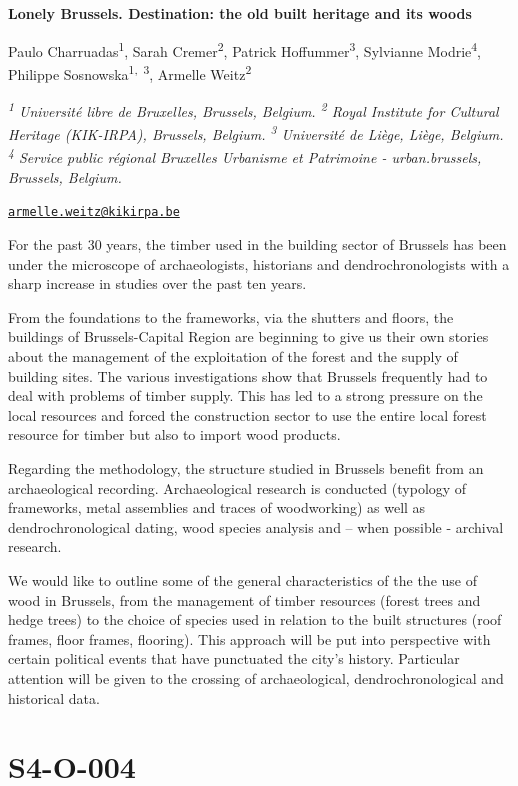 \documentclass[
]{book}
\begin{document}
\textbf{Lonely Brussels. Destination: the old built heritage and its woods}

Paulo Charruadas\textsuperscript{1}, Sarah Cremer\textsuperscript{2}, Patrick Hoffummer\textsuperscript{3}, Sylvianne Modrie\textsuperscript{4}, Philippe Sosnowska\textsuperscript{1,~3}, Armelle Weitz\textsuperscript{2}

\emph{\textsuperscript{1} Université libre de Bruxelles, Brussels, Belgium. \textsuperscript{2} Royal Institute for Cultural Heritage (KIK-IRPA), Brussels, Belgium. \textsuperscript{3} Université de Liège, Liège, Belgium. \textsuperscript{4} Service public régional Bruxelles Urbanisme et Patrimoine - urban.brussels, Brussels, Belgium.}

\href{mailto:armelle.weitz@kikirpa.be}{\nolinkurl{armelle.weitz@kikirpa.be}}

For the past 30 years, the timber used in the building sector of Brussels has been under the microscope of archaeologists, historians and dendrochronologists with a sharp increase in studies over the past ten years.

From the foundations to the frameworks, via the shutters and floors, the buildings of Brussels-Capital Region are beginning to give us their own stories about the management of the exploitation of the forest and the supply of building sites. The various investigations show that Brussels frequently had to deal with problems of timber supply. This has led to a strong pressure on the local resources and forced the construction sector to use the entire local forest resource for timber but also to import wood products.

Regarding the methodology, the structure studied in Brussels benefit from an archaeological recording. Archaeological research is conducted (typology of frameworks, metal assemblies and traces of woodworking) as well as dendrochronological dating, wood species analysis and -- when possible - archival research.

We would like to outline some of the general characteristics of the the use of wood in Brussels, from the management of timber resources (forest trees and hedge trees) to the choice of species used in relation to the built structures (roof frames, floor frames, flooring). This approach will be put into perspective with certain political events that have punctuated the city's history. Particular attention will be given to the crossing of archaeological, dendrochronological and historical data.

\hypertarget{s4-o-004}{%
\section*{S4-O-004}\label{s4-o-004}}
\end{document}
